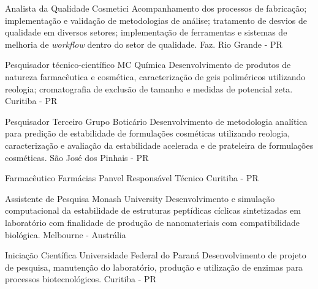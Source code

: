 {Analista da Qualidade}
{Cosmetici}
{
    Acompanhamento dos processos de fabricação;
    implementação e validação de metodologias de análise;
    tratamento de desvios de qualidade em diversos setores;
    implementação de ferramentas e sistemas de melhoria de \emph{workflow} 
    dentro do setor de qualidade.
}
{Faz. Rio Grande - PR}






{Pesquisador técnico-científico}
{MC Química}
{
    Desenvolvimento de produtos de natureza farmacêutica e cosmética, 
    caracterização de geis poliméricos utilizando reologia;
    cromatografia de exclusão de tamanho e medidas de potencial zeta.
}
{Curitiba - PR}

{Pesquisador Terceiro}
{Grupo Boticário}
{
Desenvolvimento de metodologia analítica para predição de estabilidade
de formulações cosméticas utilizando reologia,
caracterização e avaliação da estabilidade acelerada e de prateleira
de formulações cosméticas.
}
{São José dos Pinhais - PR}

{Farmacêutico}
{Farmácias Panvel}
{Responsável Técnico}
{Curitiba - PR}

{Assistente de Pesquisa}
{Monash University}
{
Desenvolvimento e simulação computacional da estabilidade 
de estruturas peptídicas cíclicas sintetizadas em laboratório 
com finalidade de produção de nanomateriais com compatibilidade biológica.
}
{Melbourne - Austrália}

{Iniciação Científica}
{Universidade Federal do Paraná}
{
Desenvolvimento de projeto de pesquisa, 
manutenção do laboratório, 
produção e utilização de enzimas para processos biotecnológicos.
}
{Curitiba - PR}